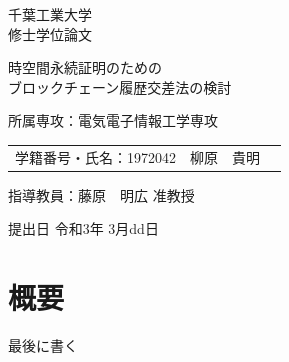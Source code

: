 \documentclass[a4paper,12pt]{jsarticle}
\begin{document}
\begin{titlepage}
\begin{center}
\fontsize{14pt}{0pt}\selectfont
\par
千葉工業大学\\
修士学位論文

\vspace{3cm}

\fontsize{14pt}{3pt}\selectfont
\par
\Huge 時空間永続証明のための\\
\Huge ブロックチェーン履歴交差法の検討\\

\vspace{7cm}

\fontsize{14pt}{1cm}\selectfont
\par
所属専攻：電気電子情報工学専攻
\vspace{0.25cm}

\fontsize{14pt}{0pt}\selectfont
\begin{tabular}{lll}
学籍番号・氏名：1972042 & 柳原　貴明 \\
\end{tabular}

\vspace{1cm}

\par
指導教員：藤原　明広 准教授

\vspace{1cm}

\par
提出日 令和3年 3月dd日
\end{center}
\end{titlepage}

\normalsize
{}


\section*{概要}
最後に書く


\newpage
\tableofcontents
\newpage
\end{document}
